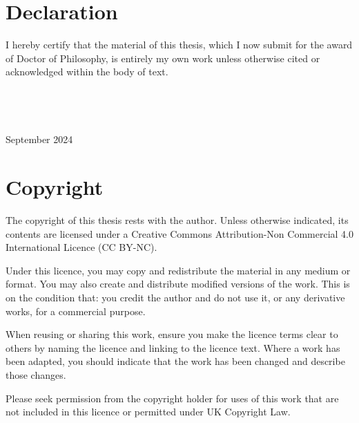 \chapter*{Declaration}

I hereby certify that the material of this thesis, which I now submit for the award of Doctor of Philosophy, is entirely my own work unless otherwise cited or acknowledged within the body of text.
\\
\\
\\
\\
 \\
September 2024

\begingroup
\let\clearpage\relax
\chapter*{Copyright}
The copyright of this thesis rests with the author. Unless otherwise indicated, its contents are licensed under a Creative Commons Attribution-Non Commercial 4.0 International Licence (CC BY-NC). 

Under this licence, you may copy and redistribute the material in any medium or format. You may also create and distribute modified versions of the work. This is on the condition that: you credit the author and do not use it, or any derivative works, for a commercial purpose.

When reusing or sharing this work, ensure you make the licence terms clear to others by naming the licence and linking to the licence text. Where a work has been adapted, you should indicate that the work has been changed and describe those changes. 

Please seek permission from the copyright holder for uses of this work that are not included in this licence or permitted under UK Copyright Law.

\endgroup